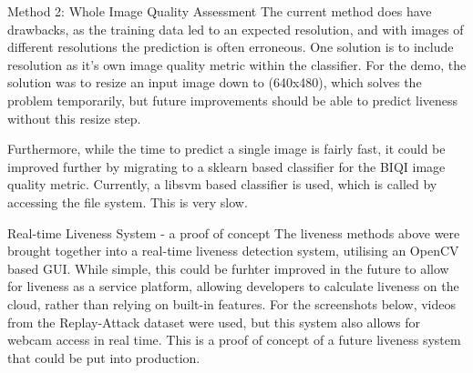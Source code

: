 \documentclass[final]{beamer}
\begin{document}
\begin{frame}{}
\begin{columns}[t]
\begin{column}{.48\linewidth}
\begin{block}{Method 2: Whole Image Quality Assessment}
          The current method does have drawbacks, as the training data led to an expected resolution, and with images of different resolutions
          the prediction is often erroneous. One solution is to include resolution as it's own image quality metric within the classifier. For the demo,
          the solution was to resize an input image down to (640x480), which solves the problem temporarily, but future improvements should be able to predict
          liveness without this resize step.

          Furthermore, while the time to predict a single image is fairly fast, it could be improved further by migrating to a sklearn based classifier for the BIQI image quality metric.
          Currently, a libsvm based classifier is used, which is called by accessing the file system. This is very slow.

        \end{block}
     


        \begin{block}{Real-time Liveness System - a proof of concept}
          The liveness methods above were brought together into a real-time liveness detection system, utilising an OpenCV based GUI.
          While simple, this could be furhter improved in the future to allow for liveness as a service platform, allowing developers to calculate liveness on the cloud,
          rather than relying on built-in features. For the screenshots below, videos from the Replay-Attack dataset were used, but this system also allows for webcam access in real time.
          This is a proof of concept of a future liveness system that could be put into production.


\end{block}
\end{column}
\end{columns}
\end{frame}
\end{document}
